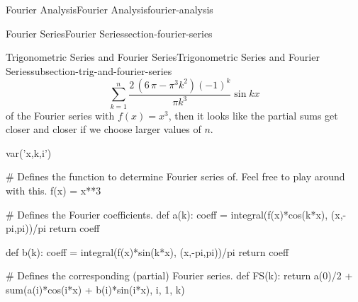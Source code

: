 \documentclass[oneside,10pt,]{book}
\numberwithin{equation}{section}
\begin{document}
\begin{chapterptx}{Fourier Analysis}{}{Fourier Analysis}{}{}{fourier-analysis}
\begin{sectionptx}{Fourier Series}{}{Fourier Series}{}{}{section-fourier-series}
\begin{subsectionptx}{Trigonometric Series and Fourier Series}{}{Trigonometric Series and Fourier Series}{}{}{subsection-trig-and-fourier-series}
\begin{equation*}
\sum_{k=1}^{n}\frac{2 \, {\left(6 \, \pi - \pi^{3} k^{2}\right)} \left(-1\right)^{k}}{\pi k^{3}}\sin kx
\end{equation*}
of the Fourier series with \(f(x) = x^{3}\), then it looks like the partial sums get closer and closer if we choose larger values of \(n\).%
\begin{sageinput}
var('x,k,i')

# Defines the function to determine Fourier series of. Feel free to play around with this.
f(x) = x**3

# Defines the Fourier coefficients.
def a(k):
  coeff = integral(f(x)*cos(k*x), (x,-pi,pi))/pi
  return coeff

def b(k):
  coeff = integral(f(x)*sin(k*x), (x,-pi,pi))/pi
  return coeff

# Defines the corresponding (partial) Fourier series.
def FS(k):
  return a(0)/2 + sum(a(i)*cos(i*x) + b(i)*sin(i*x), i, 1, k)


\end{sageinput}
\end{subsectionptx}
\end{sectionptx}
\end{chapterptx}
\end{document}
